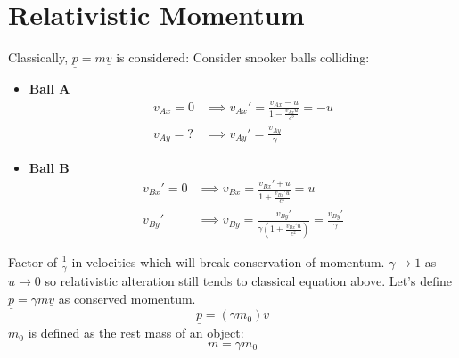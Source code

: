 \documentclass[a4paper, 11pt, normalem]{report}
\begin{document}
\section{Relativistic Momentum}
Classically, $\underline{p} = m\underline{v}$ is considered:
Consider snooker balls colliding:
\begin{itemize}
    \item \textbf{Ball A}
        \begin{align}
            v_{Ax} = 0 &\implies v_{Ax}' = \frac{v_{Ax} - u}{1 - \tfrac{v_{Ax}u}{c^{2}}} = -u \\
            v_{Ay} = ? &\implies v_{Ay}' = \frac{v_{Ay}}{\gamma}
        \end{align}
    \item \textbf{Ball B}
        \begin{align}
            v_{Bx}' = 0 &\implies v_{Bx} = \frac{v_{Bx}' + u}{1 + \tfrac{v_{Bx}'u}{c^{2}}} = u \\
            v_{By}' &\implies v_{By} = \frac{v_{By}'}{\gamma(1 + \tfrac{v_{Bx}'u}{c^{2}})} = \frac{v_{By}'}{\gamma}
        \end{align}
\end{itemize}
Factor of $\frac{1}{\gamma}$ in velocities which will break conservation of momentum.
$\gamma \rightarrow 1$ as $u \rightarrow 0$ so relativistic alteration still tends to classical equation above.
Let's define $\underline{p} = \gamma m\underline{v}$ as conserved momentum.
\begin{equation}
    \underline{p} = (\gamma m_{0})\underline{v}
\end{equation}
$m_{0}$ is defined as the rest mass of an object:
\begin{equation}
    m = \gamma m_{0}
\end{equation}
\end{document}
